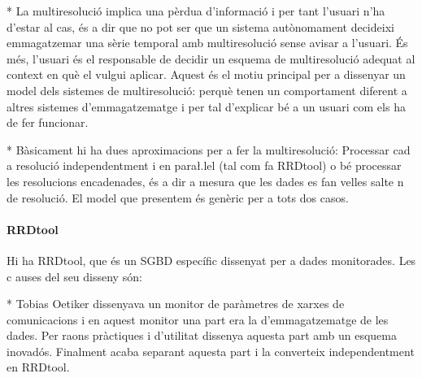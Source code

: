 


* La multiresolució implica una pèrdua d'informació i per tant l'usuari n'ha d'estar al cas, és a dir que no pot ser que un sistema autònomament decideixi emmagatzemar una sèrie temporal amb multiresolució sense avisar a l'usuari. És més, l'usuari és el responsable de decidir un esquema de multiresolució adequat al context en què el vulgui aplicar.  Aquest és el motiu principal per a dissenyar un model dels sistemes de multiresolució: perquè tenen un comportament diferent a altres sistemes d'emmagatzematge i per tal d'explicar bé a un usuari com els ha de fer funcionar.


* Bàsicament hi ha dues aproximacions per a fer la multiresolució: Processar cad
a resolució independentment i en para\l.lel (tal com fa RRDtool) o bé processar 
les resolucions encadenades, és a dir a mesura que les dades es fan velles salte
n de resolució. El model que presentem és genèric per a tots dos casos.








\paragraph{RRDtool}



Hi ha RRDtool, que és un SGBD específic dissenyat per a dades monitorades. Les c
auses del seu disseny són:

* Tobias Oetiker dissenyava un monitor de paràmetres de xarxes de comunicacions i en aquest monitor una part era la d'emmagatzematge de les dades. Per raons pràctiques i d'utilitat dissenya aquesta part amb un esquema inovadós. Finalment acaba separant aquesta part i la converteix independentment en RRDtool.

